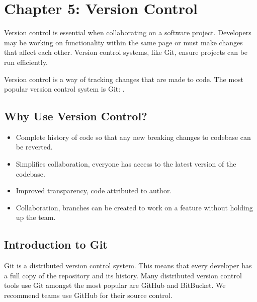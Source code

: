 \documentclass[letterpaper,10pt,english]{jupyterBook}
\begin{document}
\chapter{Chapter 5: Version Control}
\label{\detokenize{chapter_5/version_control:chapter-5-version-control}}\label{\detokenize{chapter_5/version_control::doc}}
\sphinxAtStartPar
Version control is essential when collaborating on a software project.
Developers may be working on functionality within the same page or must
make changes that affect each other. Version control systems, like Git,
ensure projects can be run efficiently.

\sphinxAtStartPar
Version control is a way of tracking changes that are made to code. The
most popular version control system is Git:
.


\section{Why Use Version Control?}
\label{\detokenize{chapter_5/version_control:why-use-version-control}}\begin{itemize}
\item {} 
\sphinxAtStartPar
Complete history of code so that any new breaking changes to
codebase can be reverted.

\item {} 
\sphinxAtStartPar
Simplifies collaboration, everyone has access to the latest version
of the codebase.

\item {} 
\sphinxAtStartPar
Improved transparency, code attributed to author.

\item {} 
\sphinxAtStartPar
Collaboration, branches can be created to work on a feature without
holding up the team.

\end{itemize}


\section{Introduction to Git}
\label{\detokenize{chapter_5/version_control:introduction-to-git}}
\sphinxAtStartPar
Git is a distributed version control system. This means that every
developer has a full copy of the repository and its history. Many
distributed version control tools use Git \sphinxhyphen{} amongst the most popular are
GitHub and BitBucket. We recommend teams use GitHub for their source
control.
\end{document}

